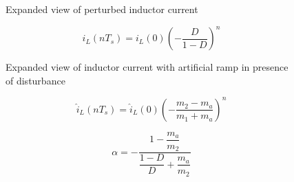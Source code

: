 \documentclass[10pt]{beamer}
\begin{document}
  \begin{figure}
    \centering
    
    \caption{Expanded view of perturbed inductor current}
    \label{fig:20}
  \end{figure}

  \begin{equation}
    i_L(nT_s) = i_L(0)\left( -\dfrac{D}{1-D} \right)^n
    \label{eq:7}
  \end{equation}

  \begin{figure}
    \centering
    
    \caption{Expanded view of inductor current with artificial ramp in presence of disturbance}
    \label{fig:23}
  \end{figure}

  \begin{equation}
    \hat{i}_L(nT_s) = \hat{i}_L(0)\left(-\dfrac{m_2-m_a}{m_1+m_a} \right)^n
    \label{eq:13}
  \end{equation}

  \begin{equation}
    \alpha = -\dfrac{1-\dfrac{m_a}{m_2}}{\dfrac{1-D}{D}+\dfrac{m_a}{m_2}}
    \label{eq:15}
  \end{equation}
\end{document}
